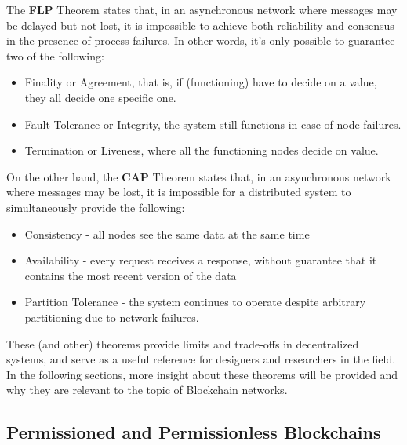 % 
% 
% 
% 

The \textbf{FLP} Theorem states that, in an asynchronous network where messages may be delayed but not lost, it is impossible to achieve both reliability and consensus in the presence of process failures. In other words, it's only possible to guarantee two of the following:
\begin{itemize}
    \item Finality or Agreement, that is, if (functioning) have to decide on a value, they all decide one specific one.
    \item Fault Tolerance or Integrity, the system still functions in case of node failures.
    \item Termination or Liveness, where all the functioning nodes decide on value.
\end{itemize}



On the other hand, the \textbf{CAP} Theorem states that, in an asynchronous network where messages may be lost, it is impossible for a distributed system to simultaneously provide the following:
\begin{itemize}
    \item Consistency - all nodes see the same data at the same time
    \item Availability - every request receives a response, without guarantee that it contains the most recent version of the data
    \item Partition Tolerance - the system continues to operate despite arbitrary partitioning due to network failures.
\end{itemize}


These (and other) theorems provide limits and trade-offs in decentralized systems, and serve as a useful reference for designers and researchers in the field.
In the following sections, more insight about these theorems will be provided and why they are relevant to the topic of Blockchain networks.

\subsection*{Permissioned and Permissionless Blockchains}

